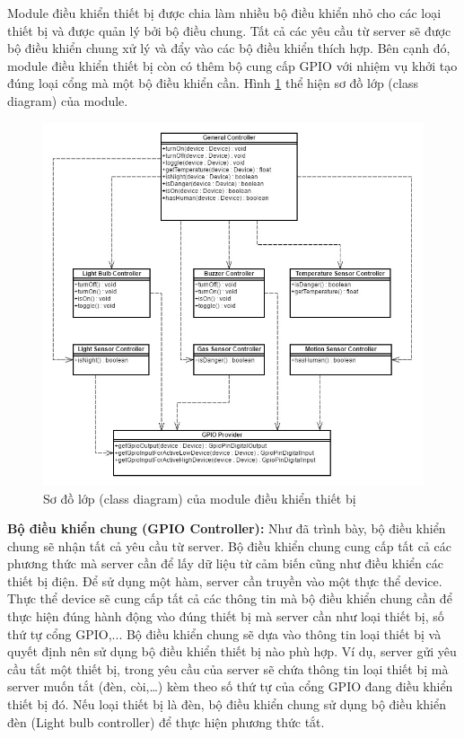 \documentclass[12pt,a4paper,oneside]{extbook}
\begin{document}
Module điều khiển thiết bị được chia làm nhiều bộ điều khiển nhỏ cho các loại thiết bị và được quản lý bởi bộ điều chung. Tất cả các yêu cầu từ server sẽ được bộ điều khiển chung xử lý và đẩy vào các bộ điều khiển thích hợp. Bên cạnh đó, module điều khiển thiết bị còn có thêm bộ cung cấp GPIO với nhiệm vụ khởi tạo đúng loại cổng mà một bộ điều khiển cần. Hình \ref{fig:6-module-dieu-khien-class-diagram} thể hiện sơ đồ lớp (class diagram) của module.

\begin{figure}[h]
  \centering
     \includegraphics[scale=0.5]{6-module-dieu-khien-class-diagram}
  \caption{Sơ đồ lớp (class diagram) của module điều khiển thiết bị}\label{fig:6-module-dieu-khien-class-diagram}
\end{figure}

\textbf{Bộ điều khiển chung (GPIO Controller):} Như đã trình bày, bộ điều khiển chung sẽ nhận tất cả yêu cầu từ server. Bộ điều khiển chung cung cấp tất cả các phương thức mà server cần để lấy dữ liệu từ cảm biến cũng như điều khiển các thiết bị điện. Để sử dụng một hàm, server cần truyền vào một thực thể device. Thực thể device sẽ cung cấp tất cả các thông tin mà bộ điều khiển chung cần để thực hiện đúng hành động vào đúng thiết bị mà server cần như loại thiết bị, số thứ tự cổng GPIO,... Bộ điều khiển chung sẽ dựa vào thông tin loại thiết bị và quyết định nên sử dụng bộ điều khiển thiết bị nào phù hợp. Ví dụ, server gửi yêu cầu tắt một thiết bị, trong yêu cầu của server sẽ chứa thông tin loại thiết bị mà server muốn tắt (đèn, còi,\dots) kèm theo số thứ tự của cổng GPIO đang điều khiển thiết bị đó. Nếu loại thiết bị là đèn, bộ điều khiển chung sử dụng bộ điều khiển đèn (Light bulb controller) để thực hiện phương thức tắt.
\end{document}
